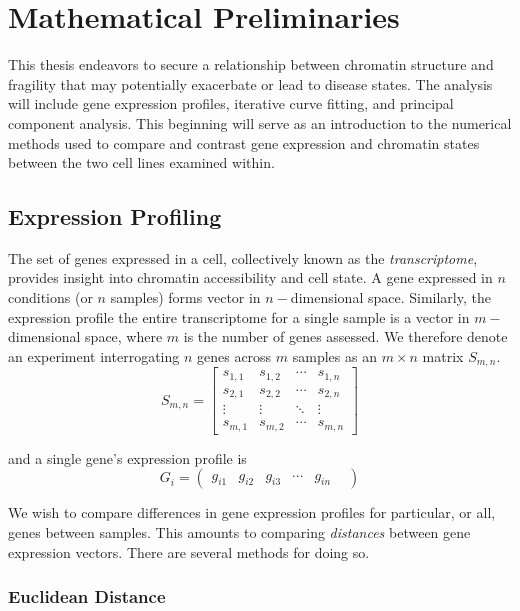 \documentclass[phd,tocprelim]{cornell}
\begin{document}
\chapter{Mathematical Preliminaries}

This thesis endeavors to secure a relationship between chromatin structure and fragility that may potentially exacerbate or lead to
disease states.  The analysis will include gene expression profiles, iterative curve fitting, and principal component analysis.  This
beginning will serve as an introduction to the numerical methods used to compare and contrast gene expression and chromatin states
between the two cell lines examined within.

\section{Expression Profiling}

The set of genes expressed in a cell, collectively known as the \textit{transcriptome}, provides insight into chromatin accessibility
and cell state.  A gene expressed in $n$ conditions (or $n$ samples) forms vector in $n-$dimensional space.  Similarly, the expression
profile the entire transcriptome for a single sample is a vector in $m-$dimensional space, where $m$ is the number of genes assessed.
We therefore denote an experiment interrogating $n$ genes across $m$ samples as an $m \times n$ matrix $S_{m,n}$.
\[
  S_{m,n} = \left[
    \begin{array}{ccc}
      s_{1,1} & s_{1,2} & \cdots & s_{1,n} \\
      s_{2,1} & s_{2,2} & \cdots & s_{2,n} \\
      \vdots & \vdots & \ddots  & \vdots \\
      s_{m,1} & s_{m,2} & \cdots & s_{m,n}
    \end{array}
  \right]
\]

and a single gene's expression profile is
\[ G_{i} = \begin{pmatrix} g_{i1} & g_{i2} & g_{i3} & \cdots & g_{in} & \end{pmatrix} \]

We wish to compare differences in gene expression profiles for particular, or all, genes between samples.  This amounts to comparing
\textit{distances} between gene expression vectors.  There are several methods for doing so.

\subsection{Euclidean Distance}
\end{document}
